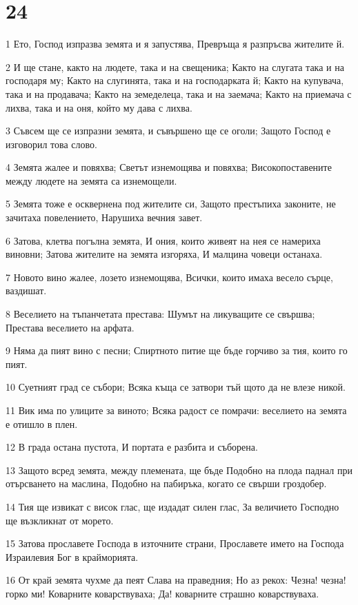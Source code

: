\chapter{24}

\par 1 Ето, Господ изпразва земята и я запустява, Превръща я разпръсва жителите й.
\par 2 И ще стане, както на людете, така и на свещеника; Както на слугата така и на господаря му; Както на слугинята, така и на господарката й; Както на купувача, така и на продавача; Както на земеделеца, така и на заемача; Както на приемача с лихва, така и на оня, който му дава с лихва.
\par 3 Съвсем ще се изпразни земята, и съвършено ще се оголи; Защото Господ е изговорил това слово.
\par 4 Земята жалее и повяхва; Светът изнемощява и повяхва; Високопоставените между людете на земята са изнемощели.
\par 5 Земята тоже е осквернена под жителите си, Защото престъпиха законите, не зачитаха повелението, Нарушиха вечния завет.
\par 6 Затова, клетва погълна земята, И ония, които живеят на нея се намериха виновни; Затова жителите на земята изгоряха, И малцина човеци останаха.
\par 7 Новото вино жалее, лозето изнемощява, Всички, които имаха весело сърце, ваздишат.
\par 8 Веселието на тъпанчетата престава: Шумът на ликуващите се свършва; Престава веселието на арфата.
\par 9 Няма да пият вино с песни; Спиртното питие ще бъде горчиво за тия, които го пият.
\par 10 Суетният град се събори; Всяка къща се затвори тъй щото да не влезе никой.
\par 11 Вик има по улиците за виното; Всяка радост се помрачи: веселието на земята е отишло в плен.
\par 12 В града остана пустота, И портата е разбита и съборена.
\par 13 Защото всред земята, между племената, ще бъде Подобно на плода паднал при отърсването на маслина, Подобно на пабиръка, когато се свърши гроздобер.
\par 14 Тия ще извикат с висок глас, ще издадат силен глас, За величието Господно ще възкликнат от морето.
\par 15 Затова прославете Господа в източните страни, Прославете името на Господа Израилевия Бог в крайморията.
\par 16 От край земята чухме да пеят Слава на праведния; Но аз рекох: Чезна! чезна! горко ми! Коварните коварствуваха; Да! коварните страшно коварствуваха.
